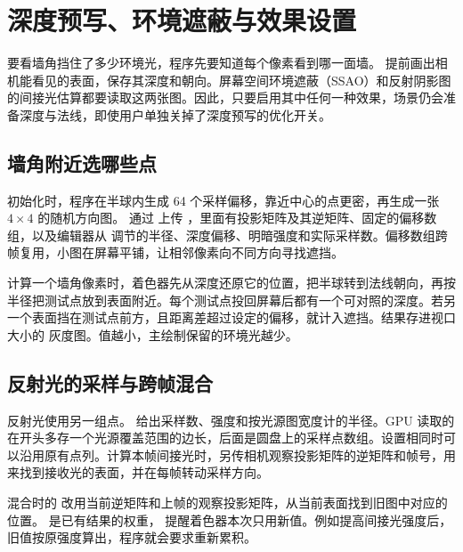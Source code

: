 \clearpage
\section{深度预写、环境遮蔽与效果设置}\label{sec:data-effects}
要看墙角挡住了多少环境光，程序先要知道每个像素看到哪一面墙。 提前画出相机能看见的表面，保存其深度和朝向。屏幕空间环境遮蔽（SSAO）和反射阴影图的间接光估算都要读取这两张图。因此，只要启用其中任何一种效果，场景仍会准备深度与法线，即使用户单独关掉了深度预写的优化开关。

\subsection{墙角附近选哪些点}
初始化时，程序在半球内生成 64 个采样偏移，靠近中心的点更密，再生成一张 $4\times4$ 的随机方向图。 通过  上传 ，里面有投影矩阵及其逆矩阵、固定的偏移数组，以及编辑器从  调节的半径、深度偏移、明暗强度和实际采样数。偏移数组跨帧复用，小图在屏幕平铺，让相邻像素向不同方向寻找遮挡。

计算一个墙角像素时，着色器先从深度还原它的位置，把半球转到法线朝向，再按半径把测试点放到表面附近。每个测试点投回屏幕后都有一个可对照的深度。若另一个表面挡在测试点前方，且距离差超过设定的偏移，就计入遮挡。结果存进视口大小的  灰度图。值越小，主绘制保留的环境光越少。

\subsection{反射光的采样与跨帧混合}
反射光使用另一组点。 给出采样数、强度和按光源图宽度计的半径。GPU 读取的  在开头多存一个光源覆盖范围的边长，后面是圆盘上的采样点数组。设置相同时可以沿用原有点列。计算本帧间接光时，另传相机观察投影矩阵的逆矩阵和帧号，用来找到接收光的表面，并在每帧转动采样方向。

混合时的  改用当前逆矩阵和上帧的观察投影矩阵，从当前表面找到旧图中对应的位置。 是已有结果的权重， 提醒着色器本次只用新值。例如提高间接光强度后，旧值按原强度算出，程序就会要求重新累积。

